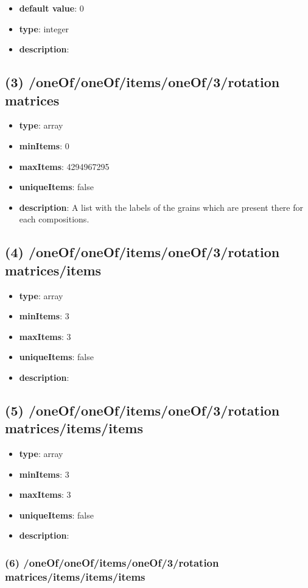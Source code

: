\begin{itemize}[leftmargin=4em]\item {\bf default value}: 0
\item {\bf type}: integer
\item {\bf description}: 
\end{itemize}\subsection{(3) /oneOf/oneOf/items/oneOf/3/rotation matrices}
\begin{itemize}[leftmargin=3em]\item {\bf type}: array
\item {\bf minItems}: 0
\item {\bf maxItems}: 4294967295
\item {\bf uniqueItems}: false
\item {\bf description}: A list with the labels of the grains which are present there for each compositions.
\end{itemize}\subsection{(4) /oneOf/oneOf/items/oneOf/3/rotation matrices/items}
\begin{itemize}[leftmargin=4em]\item {\bf type}: array
\item {\bf minItems}: 3
\item {\bf maxItems}: 3
\item {\bf uniqueItems}: false
\item {\bf description}: 
\end{itemize}\subsection{(5) /oneOf/oneOf/items/oneOf/3/rotation matrices/items/items}
\begin{itemize}[leftmargin=5em]\item {\bf type}: array
\item {\bf minItems}: 3
\item {\bf maxItems}: 3
\item {\bf uniqueItems}: false
\item {\bf description}: 
\end{itemize}\subsubsection{(6) /oneOf/oneOf/items/oneOf/3/rotation matrices/items/items/items}
